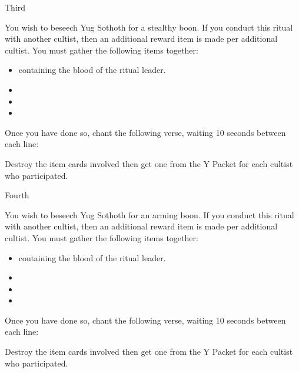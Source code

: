 \documentclass[greennotebook]{guildcamp4} %
\begin{document}
\begin{page}{Third}
	
		You wish to beseech Yug Sothoth for a stealthy boon. If you conduct this ritual with another cultist, then an additional reward item is made per additional cultist. You must gather the following items together: 
		
		\begin{itemize}
			\item \iTestTube{} containing the blood of the ritual leader.
			\item \iGlassLens{}
			\item \iCauldron{}
			\item \iChemicalV{}
		\end{itemize}		
		
		Once you have done so, chant the following verse, waiting 10 seconds between each line:
		
		
		Destroy the item cards involved then get one \iInvisibilityCloak{} from the Y Packet for each cultist who participated.
	
\end{page}

\begin{page}{Fourth}
	
		You wish to beseech Yug Sothoth for an arming boon. If you conduct this ritual with another cultist, then an additional reward item is made per additional cultist. You must gather the following items together: 
		
		\begin{itemize}
			\item \iTestTube{} containing the blood of the ritual leader.
			\item \iMultitool{}
			\item \iScrapMetal{}
			\item \iWrench {}
		\end{itemize}		
		
		Once you have done so, chant the following verse, waiting 10 seconds between each line:
		
		
		Destroy the item cards involved then get one \iCRUpPotion{} from the Y Packet for each cultist who participated.

\end{page}
\end{document}
